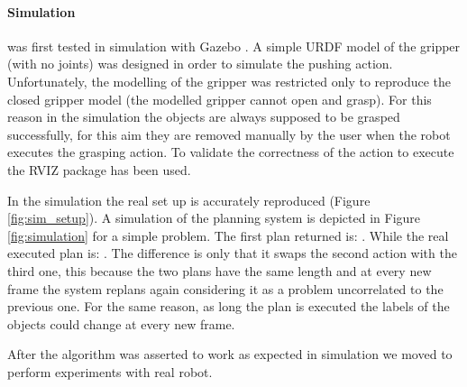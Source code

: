 

\paragraph{Simulation}
 was first tested in simulation with Gazebo\citep{koenig2004design} . A simple URDF model of the gripper (with no joints) was designed in order to simulate the pushing action. Unfortunately, the modelling of the gripper was restricted only to reproduce the closed gripper model (the modelled gripper cannot open and grasp). For this reason in the simulation the objects are always supposed to be grasped successfully, for this aim they are removed manually by the user when the robot executes the grasping action. To validate the correctness of the action to execute the RVIZ package\citep{RVIZ} has been used.  

In the simulation the real set up is accurately reproduced (Figure \ref{fig:sim_setup}). A simulation of the planning system is depicted in Figure \ref{fig:simulation} for a simple problem.
The first plan returned is: . While the real executed plan is: . The difference is only that it swaps the second action with the third one, this because the two plans have the same length and at every new frame the system replans again considering it as a problem uncorrelated to the previous one. For the same reason, as long  the plan is executed the labels of the objects could change at every new frame. %


After the algorithm was asserted to work as expected in simulation we moved to perform experiments with real robot. 

